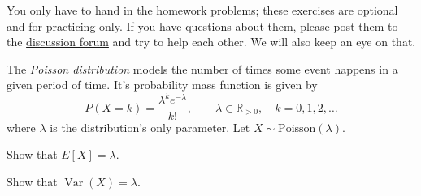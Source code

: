 \documentclass[a4paper,10pt,landscape,twocolumn]{scrartcl}
\DeclareMathOperator{\Var}{Var}
\begin{document}
\practiceproblems

{\sffamily\noindent
  You only have to hand in the homework problems; these exercises are optional
  and for practicing only. If you have questions about them, please post them
  to the \href{\discussionForumURL}{discussion forum} and try to help each
  other. We will also keep an eye on that.
}


\begin{exercise}
  The \emph{Poisson distribution} models the number of times some event
  happens in a given period of time. It's probability mass function is given by
  \[
    P(X = k) = {\frac {\lambda ^{k}e^{-\lambda }}{k!}}, 
    \qquad \lambda \in \mathbb{R}_{>0}, \quad k=0,1,2,\dots
  \]
  where $\lambda$ is the distribution's only parameter. Let $X\sim
  \text{Poisson}(\lambda)$.

  \begin{subex}
    Show that $E[X] = \lambda$.
  \end{subex}

  \begin{subex}
    Show that $\Var(X) = \lambda$.
  \end{subex}
\end{exercise}

\end{document}
